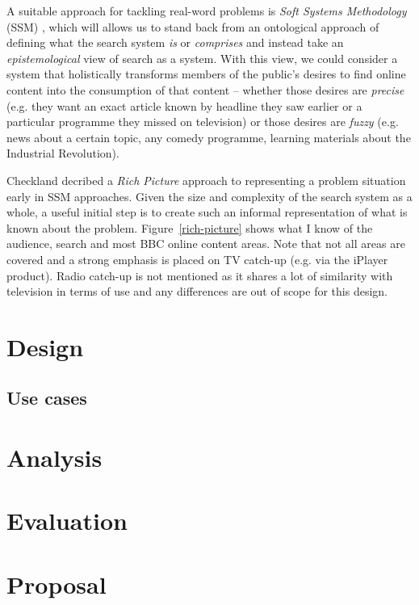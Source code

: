 \documentclass[a4paper]{report}
\begin{document}
A suitable approach for tackling real-word problems is \emph{Soft Systems Methodology} (SSM)
\cite{checkland2006learning}, which will allows us to stand back from
an ontological approach of defining what the search system \emph{is} or
\emph{comprises} and instead take an \emph{epistemological} view of search
as a system. With this view, we could consider a system that holistically
transforms members of the public's desires to find online content into
the consumption of that content -- whether those desires are \emph{precise}
(e.g. they want an exact article known by headline they saw earlier or a
particular programme they missed on television) or those desires are
\emph{fuzzy} (e.g. news about a certain topic, any comedy programme, learning
materials about the Industrial Revolution).

Checkland \cite{checkland1990soft} decribed a \emph{Rich Picture} approach to
representing a problem situation early in SSM approaches.
Given the size and complexity of the
search system as a whole, a useful initial step is to create such an informal
representation of what is known about the problem. Figure~\ref{rich-picture}
shows what I know of the audience, search and most BBC online content areas.
Note that not all areas are covered and a strong emphasis is placed on TV
catch-up (e.g. via the iPlayer product). Radio catch-up is not mentioned
as it shares a lot of similarity with television in terms of use and any
differences are out of scope for this design.

\chapter{Design}

\section{Use cases}

\chapter{Analysis}

\chapter{Evaluation}

\appendix
\chapter{Proposal}





\end{document}
